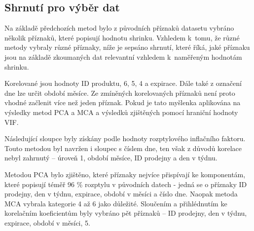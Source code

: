 \subsection*{Shrnutí pro výběr dat}

Na základě předchozích metod bylo z  původních příznaků datasetu 
vybráno několik příznaků, které popisují hodnotu shrinku.
Vzhledem k~tomu, že různé metody vybraly různé příznaky, níže je sepsáno shrnutí, které říká, jaké příznaku jsou na základě zkoumaných dat relevantní vzhledem k~naměřeným hodnotám shrinku. 

Korelované jsou hodnoty ID produktu, 6, 5, 4 a expirace. Dále také z označení dne lze určit období měsíce. Ze zmíněných korelovaných příznaků není proto vhodné začlenit více než jeden příznak. Pokud je tato myšlenka aplikována na výsledky metod PCA a MCA a výsledků zjištěných pomocí hraniční hodnoty VIF.

Následující sloupce byly získány podle hodnoty rozptylového inflačního faktoru. Touto metodou byl navržen i sloupec s číslem dne, ten však z důvodů korelace nebyl zahrnutý -- úroveň 1, období měsíce, ID prodejny a den v týdnu.
    
Metodou PCA bylo zjištěno, které příznaky nejvíce přispívají ke komponentám, které popisují téměř 96 \% rozptylu v původních datech - jedná se o příznaky ID prodejny, den v týdnu, expirace, období v měsíci a číslo dne. Naopak metoda MCA vybrala kategorie 4 až 6 jako důležité. Sloučením a přihlédnutím ke korelačním koeficientům byly vybráno pět příznaků -- 
    ID prodejny, den v týdnu, expirace, období v měsíci, 5.

